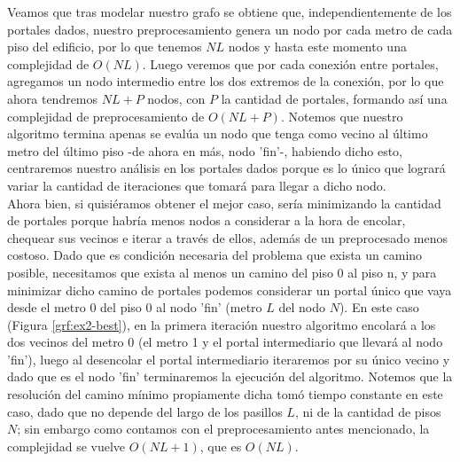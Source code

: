 \documentclass{article}
\theoremstyle{definition}
\theoremstyle{remark}
\begin{document}
Veamos que tras modelar nuestro grafo se obtiene que, independientemente de los portales dados, nuestro preprocesamiento genera un nodo por cada metro de cada piso del edificio, por lo que tenemos $NL$ nodos y hasta este momento una complejidad de $O(NL)$. Luego veremos que por cada conexión entre portales, agregamos un nodo intermedio entre los dos extremos de la conexión, por lo que ahora tendremos $NL+P$ nodos, con $P$ la cantidad de portales, formando así una complejidad de preprocesamiento de $O(NL+P)$. Notemos que nuestro algoritmo termina apenas se evalúa un nodo que tenga como vecino al último metro del último piso -de ahora en más, nodo 'fin'-, habiendo dicho esto, centraremos nuestro análisis en los portales dados porque es lo único que logrará variar la cantidad de iteraciones que tomará para llegar a dicho nodo. \\

Ahora bien, si quisiéramos obtener el mejor caso, sería minimizando la cantidad de portales porque habría menos nodos a considerar a la hora de encolar, chequear sus vecinos e iterar a través de ellos, además de un preprocesado menos costoso. Dado que es condición necesaria del problema que exista un camino posible, necesitamos que exista al menos un camino del piso 0 al piso n, y para minimizar dicho camino de portales podemos considerar un portal único que vaya desde el metro 0 del piso 0 al nodo 'fin' (metro $L$ del nodo $N$). En este caso (Figura \ref{grf:ex2-best}), en la primera iteración nuestro algoritmo encolará a los dos vecinos del metro 0 (el metro 1 y el portal intermediario que llevará al nodo 'fin'), luego al desencolar el portal intermediario iteraremos por su único vecino y dado que es el nodo 'fin' terminaremos la ejecución del algoritmo. Notemos que la resolución del camino mínimo propiamente dicha tomó tiempo constante en este caso, dado que no depende del largo de los pasillos $L$, ni de la cantidad de pisos $N$; sin embargo como contamos con el preprocesamiento antes mencionado, la complejidad se vuelve $O(NL+1)$, que es $O(NL)$. \\
    
\end{document}
